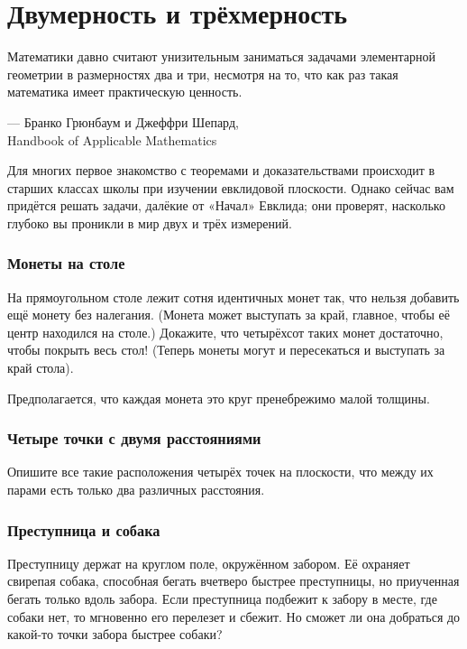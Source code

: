 \chapter{Двумерность и трёхмерность}

\setlength{\epigraphwidth}{.83\textwidth}
\epigraph{Математики давно считают унизительным заниматься задачами элементарной геометрии в размерностях два и три, несмотря на то, что как раз такая математика имеет практическую ценность.}{--- Бранко Грюнбаум и Джеффри Шепард,\\ Handbook of Applicable Mathematics}

Для многих первое знакомство с теоремами и доказательствами
происходит в старших классах школы при изучении евклидовой плоскости.
Однако сейчас вам придётся решать задачи, далёкие от «Начал» Евклида;
они проверят, насколько глубоко вы проникли в мир двух и трёх измерений.

\subsection*{Монеты на столе}\label{Монеты на столе}

На прямоугольном столе лежит сотня идентичных монет так, что нельзя добавить ещё монету без налегания.
(Монета может выступать за край, главное, чтобы её центр находился на столе.)
Докажите, что четырёхсот таких монет достаточно, чтобы покрыть весь стол!
(Теперь монеты могут и пересекаться и выступать за край стола).

Предполагается, что каждая монета это круг пренебрежимо малой толщины.

\subsection*{Четыре точки с двумя расстояниями}

Опишите все такие расположения четырёх точек на плоскости, что между их парами есть только два различных расстояния.

\subsection*{Преступница и собака}

Преступницу держат на круглом  поле, окружённом забором.
Её охраняет свирепая собака, способная бегать вчетверо быстрее преступницы, но приученная бегать только вдоль забора.
Если преступница подбежит к забору в месте, где собаки нет, то мгновенно его перелезет и сбежит.
Но сможет ли она добраться до какой-то точки забора быстрее собаки?

